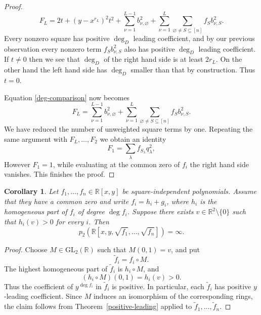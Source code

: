 \documentclass[12pt,reqno]{amsart}   	%
\newtheorem{cor}[thm]{Corollary}
\theoremstyle{remark}
\newcommand{\R}{\mathbb{R}}
\newcommand{\brac}[1]{\left ( #1 \right )}
\begin{document}
\begin{proof}
    \begin{equation}
        F_L = 2t + \brac{y-x^{r_L}}^2t^2 + \sum_{\nu=1}^{L-1} b_{\nu,\varnothing}^2
        + \sum_{\nu=1}^L \sum_{\varnothing\neq S\subseteq[n]} f_Sb_{\nu,S}^2 .
        \label{deg-comparison}
    \end{equation}
    Every nonzero square has positive $\deg_D$ leading coefficient, and by our previous observation every nonzero term $f_Sb_{\nu,S}^2$ also has positive $\deg_D$ leading coefficient. If $t\neq0$ then we see that $\deg_D$ of the right hand side is at least $2r_L$. On the other hand the left hand side has $\deg_D$ smaller than that by construction. Thus $t=0$.

    Equation \eqref{deg-comparison} now becomes
    \[
        F_L = \sum_{\nu=1}^{L-1} b_{\nu,\varnothing}^2
        + \sum_{\nu=1}^L \sum_{\varnothing\neq S\subseteq[n]} f_Sb_{\nu,S}^2 .
    \]
    We have reduced the number of unweighted square terms by one. Repeating the same argument with $F_L,\dots,F_2$ we obtain an identity
    \[
    F_1 = \sum_\lambda f_{S_\lambda}q_\lambda^2,
    \]
    However $F_1=1$, while evaluating at the common zero of $f_i$ the right hand side vanishes. This finishes the proof.
\end{proof}

\begin{cor}
    Let $f_1,\dots, f_n\in\R[x,y]$ be square-independent polynomials. Assume that they have a common zero and write $f_i = h_i+g_i$, where $h_i$ is the homogeneous part of $f_i$ of degree $\deg f_i$. Suppose there exists $v\in\R^2\setminus\{0\}$ such that $h_i(v)>0$ for every $i$. Then
    \[
    p_2\brac{\R[x,y,\sqrt{f_1},\dots,\sqrt{f_n}]} = \infty.
    \]
\end{cor}
\begin{proof}
     Choose $M\in\mathrm{GL}_2(\mathbb R)$ such that $M(0,1)=v$, and put
    \[
            \widetilde f_i=f_i\circ M.
    \]
    The highest homogeneous part of $\widetilde f_i$ is $h_i\circ M$, and
    \[
            (h_i\circ M)(0,1)=h_i(v)>0.
    \]
    Thus the coefficient of $y^{\deg f_i}$ in $\widetilde f_i$ is positive.
    In particular, each $\widetilde f_i$ has positive $y$-leading coefficient.
    Since $M$ induces an isomorphism of the corresponding rings, the
    claim follows from Theorem~\ref{positive-leading} applied to
    $\widetilde f_1,\ldots,\widetilde f_n$.
\end{proof}
\end{document}
